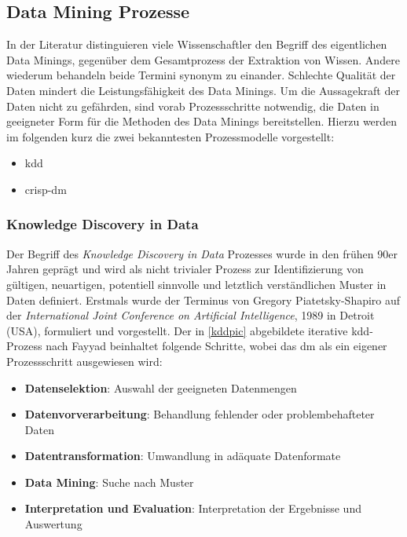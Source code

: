 \subsection{Data Mining Prozesse}
\label{prozdm}

In der Literatur dis\-tin\-guie\-ren viele Wissenschaftler den Begriff des eigentlichen Data Minings, gegenüber dem Gesamtprozess der Extraktion von Wissen. Andere wiederum behandeln beide Termini synonym zu einander. Schlechte Qualität der Daten mindert die Leistungsfähigkeit des Data Minings. Um die Aussagekraft der Daten nicht zu gefährden, sind vorab Prozessschritte notwendig, die Daten in geeigneter Form für die Methoden des Data Minings bereitstellen.  Hierzu werden im folgenden kurz die zwei bekanntesten Prozessmodelle vorgestellt:

\begin{itemize}
\item \gls{kdd}
\item \gls{crisp-dm}
\end{itemize}

\subsubsection{Knowledge Discovery in Data}
\label{dmkdd}

Der Begriff des \textit{Knowledge Discovery in Data} Prozesses wurde in den frühen 90er Jahren geprägt und wird als \glqq nicht trivialer Prozess zur Identifizierung von gültigen, neuartigen, potentiell sinnvolle und letztlich verständlichen Muster in Daten\grqq{} definiert. Erstmals wurde der Terminus von Gregory Piatetsky-Shapiro auf der \textit{International Joint Conference on Artificial Intelligence}, 1989 in Detroit (USA), formuliert und vorgestellt. Der in \vref{kddpic} abgebildete iterative \gls{kdd}-Prozess nach Fayyad beinhaltet folgende Schritte, wobei das \gls{dm} als ein eigener Prozessschritt ausgewiesen wird:

\begin{itemize}
\item \textbf{Datenselektion}: Auswahl der geeigneten Datenmengen
\item \textbf{Datenvorverarbeitung}: Behandlung fehlender oder problembehafteter Daten
\item \textbf{Datentransformation}: Umwandlung in adäquate Datenformate
\item \textbf{Data Mining}: Suche nach Muster
\item \textbf{Interpretation und Evaluation}: Interpretation der Ergebnisse und Auswertung
\end{itemize}

